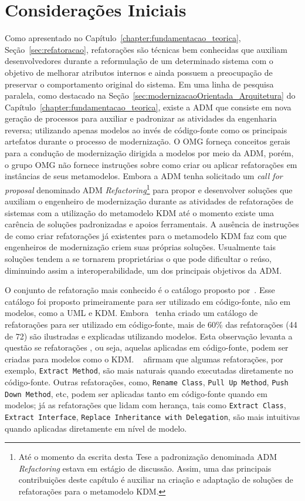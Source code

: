 \section{Considerações Iniciais}

Como apresentado no Capítulo~\ref{chapter:fundamentacao_teorica}, Seção~\ref{sec:refatoracao}, refatorações são técnicas bem conhecidas que auxiliam desenvolvedores durante a reformulação de um determinado sistema com o objetivo de melhorar atributos internos e ainda possuem a preocupação de preservar o comportamento original do sistema. Em uma linha de pesquisa paralela, como destacado na Seção~\ref{sec:modernizacaoOrientada_Arquitetura} do Capítulo~\ref{chapter:fundamentacao_teorica}, existe a ADM que consiste em nova geração de processos para auxiliar e padronizar as atividades da engenharia reversa; utilizando apenas modelos ao invés de código-fonte como os principais artefatos durante o processo de modernização. O OMG forneça conceitos gerais para a condução de modernização dirigida a modelos por meio da ADM, porém, o grupo OMG não fornece instruções sobre como criar ou aplicar refatorações em instâncias de seus metamodelos. Embora a ADM tenha solicitado um \textit{call for proposal} denominado ADM \textit{Refactoring}\footnote{Até o momento da escrita desta Tese a padronização denominada ADM \textit{Refactoring} estava em estágio de discussão. Assim, uma das principais contribuições deste capítulo é auxiliar na criação e adaptação de soluções de refatorações para o metamodelo KDM.} para propor e desenvolver soluções que auxiliam o engenheiro de modernização durante as atividades de refatorações de sistemas com a utilização do metamodelo KDM até o momento existe uma carência de soluções padronizadas e apoios ferramentais. A ausência de instruções de como criar refatorações já existentes para o metamodelo KDM faz com que engenheiros de modernização criem suas próprias soluções. Usualmente tais soluções tendem a se tornarem proprietárias o que pode dificultar o reúso, diminuindo assim a interoperabilidade, um dos principais objetivos da ADM.

O conjunto de refatoração mais conhecido é o catálogo proposto por~. Esse catálogo foi proposto primeiramente para ser utilizado em código-fonte, não em modelos, como a UML e KDM. Embora~ tenha criado um catálogo de refatorações para ser utilizado em código-fonte, mais de 60\% das refatorações (44 de 72) são ilustradas e explicadas utilizando modelos. Esta observação levanta a questão se refatorações , ou seja, aquelas aplicadas em código-fonte, podem ser criadas para modelos como o KDM. ~ afirmam que algumas refatorações, por exemplo, \texttt{Extract Method}, são mais naturais quando executadas diretamente no código-fonte. Outras refatorações, como, \texttt{Rename Class}, \texttt{Pull Up Method}, \texttt{Push Down Method}, etc, podem ser aplicadas tanto em código-fonte quando em modelos; já as refatorações que lidam com herança, tais como \texttt{Extract Class}, \texttt{Extract Interface}, \texttt{Replace Inheritance with Delegation}, são mais intuitivas quando aplicadas diretamente em nível de modelo. 

